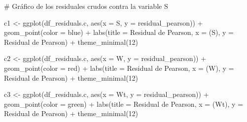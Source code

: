 \documentclass[
  letterpaper,
  DIV=11,
  numbers=noendperiod]{scrartcl}
\newenvironment{Shaded}{\begin{snugshade}}{\end{snugshade}}
\newcommand{\AttributeTok}[1]{\textcolor[rgb]{0.40,0.45,0.13}{#1}}
\newcommand{\CommentTok}[1]{\textcolor[rgb]{0.37,0.37,0.37}{#1}}
\newcommand{\DecValTok}[1]{\textcolor[rgb]{0.68,0.00,0.00}{#1}}
\newcommand{\FunctionTok}[1]{\textcolor[rgb]{0.28,0.35,0.67}{#1}}
\newcommand{\NormalTok}[1]{\textcolor[rgb]{0.00,0.23,0.31}{#1}}
\newcommand{\OtherTok}[1]{\textcolor[rgb]{0.00,0.23,0.31}{#1}}
\newcommand{\SpecialCharTok}[1]{\textcolor[rgb]{0.37,0.37,0.37}{#1}}
\newcommand{\StringTok}[1]{\textcolor[rgb]{0.13,0.47,0.30}{#1}}
\begin{document}
\begin{Shaded}
\begin{Highlighting}[]
\CommentTok{\# Gráfico de los residuales crudos contra la variable S}

\NormalTok{c1 }\OtherTok{\textless{}{-}} \FunctionTok{ggplot}\NormalTok{(df\_residuals.c, }\FunctionTok{aes}\NormalTok{(}\AttributeTok{x =}\NormalTok{ S, }\AttributeTok{y =}\NormalTok{ residual\_pearson)) }\SpecialCharTok{+}
    \FunctionTok{geom\_point}\NormalTok{(}\AttributeTok{color =} \StringTok{\textquotesingle{}blue\textquotesingle{}}\NormalTok{) }\SpecialCharTok{+}
    \FunctionTok{labs}\NormalTok{(}\AttributeTok{title =} \StringTok{\textquotesingle{}Residual de Pearson\textquotesingle{}}\NormalTok{, }\AttributeTok{x =} \StringTok{\textquotesingle{}(S)\textquotesingle{}}\NormalTok{, }\AttributeTok{y =} \StringTok{\textquotesingle{}Residual de Pearson\textquotesingle{}}\NormalTok{) }\SpecialCharTok{+}
    \FunctionTok{theme\_minimal}\NormalTok{(}\DecValTok{12}\NormalTok{)}

\NormalTok{c2 }\OtherTok{\textless{}{-}} \FunctionTok{ggplot}\NormalTok{(df\_residuals.c, }\FunctionTok{aes}\NormalTok{(}\AttributeTok{x =}\NormalTok{ W, }\AttributeTok{y =}\NormalTok{ residual\_pearson)) }\SpecialCharTok{+}
    \FunctionTok{geom\_point}\NormalTok{(}\AttributeTok{color =} \StringTok{\textquotesingle{}red\textquotesingle{}}\NormalTok{) }\SpecialCharTok{+}
    \FunctionTok{labs}\NormalTok{(}\AttributeTok{title =} \StringTok{\textquotesingle{}Residual de Pearson\textquotesingle{}}\NormalTok{, }\AttributeTok{x =} \StringTok{\textquotesingle{}(W)\textquotesingle{}}\NormalTok{, }\AttributeTok{y =} \StringTok{\textquotesingle{}Residual de Pearson\textquotesingle{}}\NormalTok{) }\SpecialCharTok{+}
    \FunctionTok{theme\_minimal}\NormalTok{(}\DecValTok{12}\NormalTok{)}

\NormalTok{c3 }\OtherTok{\textless{}{-}} \FunctionTok{ggplot}\NormalTok{(df\_residuals.c, }\FunctionTok{aes}\NormalTok{(}\AttributeTok{x =}\NormalTok{ Wt, }\AttributeTok{y =}\NormalTok{ residual\_pearson)) }\SpecialCharTok{+}
    \FunctionTok{geom\_point}\NormalTok{(}\AttributeTok{color =} \StringTok{\textquotesingle{}green\textquotesingle{}}\NormalTok{) }\SpecialCharTok{+}
    \FunctionTok{labs}\NormalTok{(}\AttributeTok{title =} \StringTok{\textquotesingle{}Residual de Pearson\textquotesingle{}}\NormalTok{, }\AttributeTok{x =} \StringTok{\textquotesingle{}(Wt)\textquotesingle{}}\NormalTok{, }\AttributeTok{y =} \StringTok{\textquotesingle{}Residual de Pearson\textquotesingle{}}\NormalTok{) }\SpecialCharTok{+}
    \FunctionTok{theme\_minimal}\NormalTok{(}\DecValTok{12}\NormalTok{)}


\end{Highlighting}
\end{Shaded}
\end{document}
